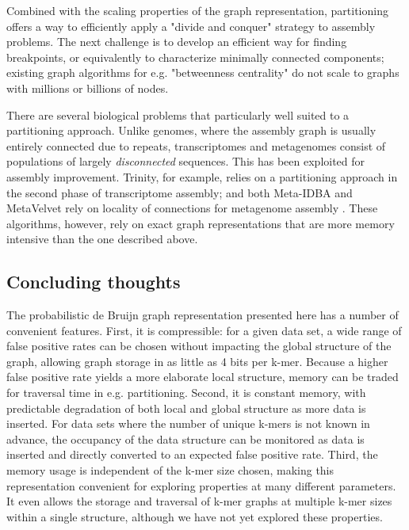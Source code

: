 \documentclass[12pt]{article} \usepackage{simplemargins}
\begin{document}
Combined with the scaling properties of the graph representation,
partitioning offers a way to efficiently apply a "divide and conquer"
strategy to assembly problems.  The next challenge is to develop an
efficient way for finding breakpoints, or equivalently to characterize
minimally connected components; existing graph algorithms for
e.g. "betweenness centrality" do not scale to graphs with millions or
billions of nodes.

There are several biological problems that particularly well suited to
a partitioning approach.  Unlike genomes, where the assembly graph is
usually entirely connected due to repeats, transcriptomes and
metagenomes consist of populations of largely {\em disconnected}
sequences.  This has been exploited for assembly improvement.
Trinity, for example, relies on a partitioning approach in the second
phase of transcriptome assembly; and both Meta-IDBA and
MetaVelvet rely on locality of connections for metagenome assembly
\cite{trinity,pubmed21685107,metavelvet}.
These algorithms, however, rely on exact graph representations that are
more memory intensive than the one described above.

\subsection{Concluding thoughts}

The probabilistic de Bruijn graph representation presented here has a
number of convenient features.  First, it is compressible: for a given
data set, a wide range of false positive rates can be chosen without
impacting the global structure of the graph, allowing graph storage in
as little as 4 bits per k-mer.  Because a higher false positive rate
yields a more elaborate local structure, memory can be
traded for traversal time in e.g. partitioning.  Second, it is
constant memory, with predictable degradation of both local and global
structure as more data is inserted.  For data sets where the number of
unique k-mers is not known in advance, the occupancy of the data
structure can be monitored as data is inserted and directly converted
to an expected false positive rate.  Third, the memory usage is
independent of the k-mer size chosen, making this representation
convenient for exploring properties at many different parameters.  It
even allows the storage and traversal of k-mer graphs at multiple k-mer
sizes within a single structure, although we have not yet explored these
properties.
\end{document}
